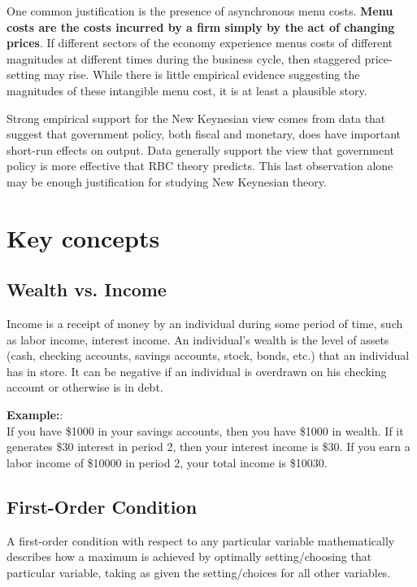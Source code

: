 \documentclass[10pt]{article}
\begin{document}
One common justification is the presence of asynchronous menu costs.
{\textbf {Menu costs are the costs incurred by a firm simply by the act of changing prices}}.
If different sectors of the economy experience menus costs of different magnitudes at different
times during the business cycle, then staggered price-setting may rise. While there is little
empirical evidence suggesting the magnitudes of these intangible menu cost, it is at least
a plausible story.

Strong empirical support for the New Keynesian view comes from data that suggest that government
policy, both fiscal and monetary, does have important short-run effects on output. Data generally
support the view that government policy is more effective that RBC theory predicts. This last
observation alone may be enough justification for studying New Keynesian theory.
\\











\section{Key concepts}
\subsection{Wealth vs. Income}
Income is a receipt of money by an individual during some period of time, such as labor income, 
interest income.
An individual's wealth is the level of assets (cash, checking accounts, savings accounts, stock, 
bonds, etc.) that an individual has in store. It can be negative if an individual is overdrawn
on his checking account or otherwise is in debt.

{\textbf {Example:}}:\\
If you have \$1000 in your savings accounts, then you have \$1000 in wealth.
If it generates \$30 interest in period 2, then your interest income is \$30.
If you earn a labor income of \$10000 in period 2, your total income is \$10030.

\subsection{First-Order Condition}
A first-order condition with respect to any particular variable mathematically describes how
a maximum is achieved by optimally setting/choosing that particular variable, taking as given the
setting/choices for all other variables.
\end{document}
